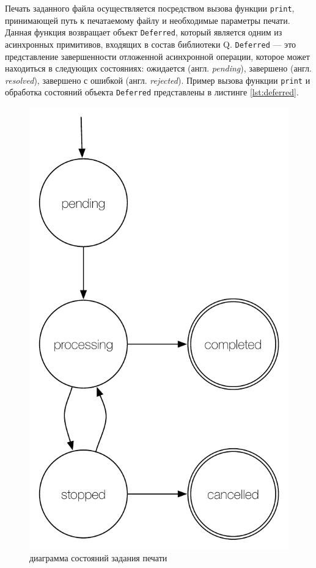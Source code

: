 \documentclass[a4paper,14pt,href]{article}
\begin{document}
Печать заданного файла осуществляется посредством вызова функции \texttt{print}, принимающей путь к печатаемому файлу и
необходимые параметры печати. Данная функция возвращает объект \texttt{Deferred}, который является одним из асинхронных
примитивов, входящих в состав библиотеки Q\cite{QLibrary}. \texttt{Deferred} --- это представление завершенности отложенной
асинхронной операции, которое может находиться в следующих состояниях: ожидается (англ. \textit{pending}),
завершено (англ. \textit{resolved}), завершено с ошибкой (англ. \textit{rejected}). Пример вызова функции \texttt{print}
и обработка состояний объекта \texttt{Deferred} представлены в листинге \ref{lst:deferred}.

\begin{figure}[htbp]
\begin{center}
  \includegraphics[scale=0.65]{state-machine.pdf}
    \caption{диаграмма состояний задания печати}
    \label{fig:StateMachine}
\end{center}
\end{figure}
\end{document}

